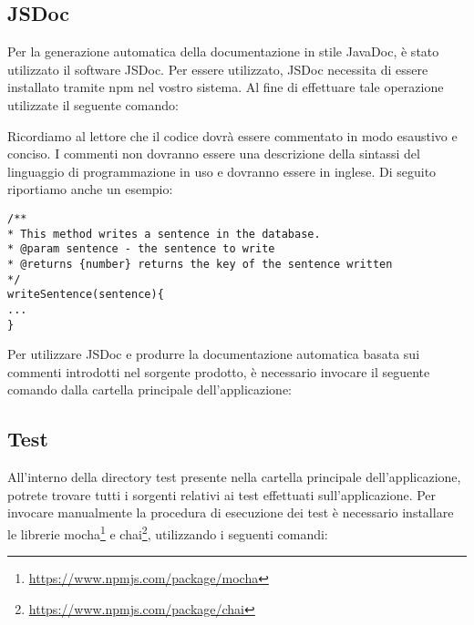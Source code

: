 \subsection{JSDoc}
Per la generazione automatica della documentazione in stile JavaDoc, è stato utilizzato il software JSDoc. 
Per essere utilizzato, JSDoc necessita di essere installato tramite npm nel vostro sistema. Al fine di effettuare tale operazione utilizzate il seguente comando:

\begin{center}
	\noindent{}
\end{center}

Ricordiamo al lettore che il codice dovrà essere commentato in modo esaustivo e conciso. I commenti non dovranno essere una descrizione della sintassi del linguaggio di programmazione in uso e dovranno essere in inglese. Di seguito riportiamo anche un esempio:

\begin{lstlisting}[caption=Esempio di commento ad un metodo]
/**
* This method writes a sentence in the database.
* @param sentence - the sentence to write
* @returns {number} returns the key of the sentence written
*/
writeSentence(sentence){
...
}
\end{lstlisting}

Per utilizzare JSDoc e produrre la documentazione automatica basata sui commenti introdotti nel sorgente prodotto, è necessario invocare il seguente comando dalla cartella principale dell'applicazione:

\begin{center}
	\noindent{}
\end{center}
	
\subsection{Test}
All'interno della directory test presente nella cartella principale dell'applicazione, potrete trovare tutti i sorgenti relativi ai test effettuati sull'applicazione.
Per invocare manualmente la procedura di esecuzione dei test è necessario installare le librerie mocha\footnote{\url{https://www.npmjs.com/package/mocha}} e chai\footnote{\url{https://www.npmjs.com/package/chai}}, utilizzando i seguenti comandi:

